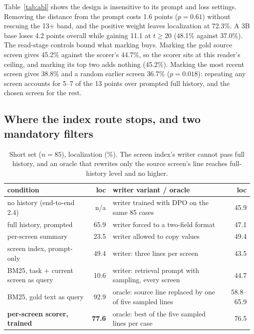 Table~\ref{tab:abl} shows the design is insensitive to its prompt and loss settings. Removing the distance from the prompt costs 1.6 points ($p=0.61$) without rescuing the 13$+$ band, and the positive weight leaves localization at 72.3\%. A 3B base loses 4.2 points overall while gaining 11.1 at $t\ge20$ (48.1\% against 37.0\%). The read-stage controls bound what marking buys. Marking the gold source screen gives 45.2\% against the scorer's 44.7\%, so the scorer sits at this reader's ceiling, and marking its top two adds nothing (45.2\%). Marking the most recent screen gives 38.8\% and a random earlier screen 36.7\% ($p=0.018$): repeating any screen accounts for 5--7 of the 13 points over prompted full history, and the chosen screen for the rest.

\subsection{Where the index route stops, and two mandatory filters}
\label{sec:index}
\begin{table}[t]
\centering\scriptsize
\caption{Short set ($n=85$), localization (\%). The screen index's writer cannot pass full history, and an oracle that rewrites only the source screen's line reaches full-history level and no higher.}
\label{tab:index}
\begin{tabular}{lr@{\hspace{2em}}lr}
\toprule
condition & loc & writer variant / oracle & loc \\
\midrule
no history (end-to-end 2.4) & n/a & writer trained with DPO on the same 85 cases & 45.9 \\
full history, prompted & 65.9 & writer forced to a two-field format & 47.1 \\
per-screen summary & 23.5 & writer allowed to copy values & 49.4 \\
screen index, prompt-only & 49.4 & writer: three lines per screen & 43.5 \\
BM25, task $+$ current screen as query & 10.6 & writer: retrieval prompt with sampling, every screen & 44.7 \\
BM25, gold text as query & 92.9 & oracle: source line replaced by one of five sampled lines & 58.8--65.9 \\
\textbf{per-screen scorer, trained} & \textbf{77.6} & oracle: best of the five sampled lines per case & 76.5 \\
\bottomrule
\end{tabular}
\end{table}

